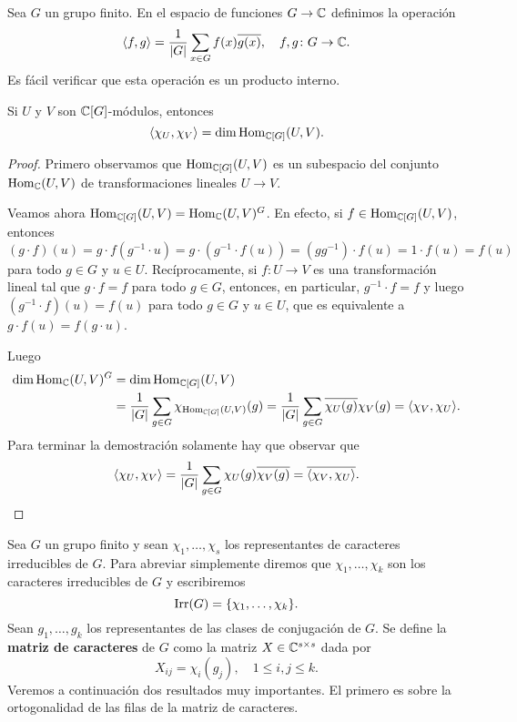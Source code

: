 Sea $G$ un grupo finito. En el espacio de funciones $G\to\mathbb{C}$ definimos la operación
\[
\langle f,g\rangle=\frac{1}{|G|}\sum_{x\in G}f(x)\overline{g(x)},
\quad f,g\colon G\to\mathbb{C}.
\]
Es fácil verificar que esta operación es un producto interno. 

\begin{theorem}
Si $U$ y $V$ son $\mathbb{C}[G]$-módulos, entonces 
\[
\langle\chi_U,\chi_V\rangle=\dim\operatorname{Hom}_{\mathbb{C}[G]}(U,V).
\]
\end{theorem}

\begin{proof}
    Primero observamos que $\operatorname{Hom}_{\mathbb{C}[G]}(U,V)$ es un subespacio del conjunto $\operatorname{Hom}_{\mathbb{C}}(U,V)$ de transformaciones lineales $U\to V$.
    
    Veamos ahora $\operatorname{Hom}_{\mathbb{C}[G]}(U,V)=\operatorname{Hom}_{\mathbb{C}}(U,V)^G$. En efecto, si $f\in\operatorname{Hom}_{\mathbb{C}[G]}(U,V)$, entonces
    \[
    (g\cdot f)(u)=g\cdot f(g^{-1}\cdot u)=g\cdot (g^{-1}\cdot f(u))=(gg^{-1})\cdot f(u)=1\cdot f(u)=f(u)
    \]
    para todo $g\in G$ y $u\in U$. Recíprocamente, si $f\colon U\to V$ es una transformación lineal tal que 
    $g\cdot f=f$ para todo $g\in G$, entonces, en particular, $g^{-1}\cdot f=f$ y luego
    $(g^{-1}\cdot f)(u)=f(u)$ para todo $g\in G$ y $u\in U$, que es equivalente a 
    $g\cdot f(u)=f(g\cdot u)$. 

    Luego
    \begin{align*}
    \dim\operatorname{Hom}_{\mathbb{C}}(U,V)^G
    &=\dim\operatorname{Hom}_{\mathbb{C}[G]}(U,V)\\
    &=\frac{1}{|G|}\sum_{g\in G}\chi_{\operatorname{Hom}_{\mathbb{C}[G]}(U,V)}(g)
    =\frac{1}{|G|}\sum_{g\in G}\overline{\chi_U(g)}\chi_V(g)
    =\langle\chi_V,\chi_U\rangle.
    \end{align*}
    Para terminar la demostración solamente hay que observar 
    que 
    \[
    \langle\chi_U,\chi_V\rangle=\frac{1}{|G|}\sum_{g\in G}\chi_U(g)\overline{\chi_V(g)}=\overline{\langle\chi_V,\chi_U\rangle}.\qedhere
    \]
\end{proof}

Sea $G$ un grupo finito y sean $\chi_1,\dots,\chi_s$ los representantes de
caracteres irreducibles de $G$. Para abreviar simplemente diremos que
$\chi_1,\dots,\chi_k$ son los caracteres irreducibles de $G$ y escribiremos
\[
	\operatorname{Irr}(G)=\{\chi_1,\dots,\chi_k\}.
\]
Sean $g_1,\dots,g_k$ los representantes de las clases de
conjugación de $G$. Se define la \textbf{matriz de caracteres} de $G$ como la
matriz $X\in\mathbb{C}^{s\times s}$ dada por
\[
X_{ij}=\chi_i(g_j),\quad
1\leq i,j\leq k.
\]
Veremos a continuación dos resultados muy importantes. El primero es
sobre la ortogonalidad de las filas de la matriz de caracteres. 

